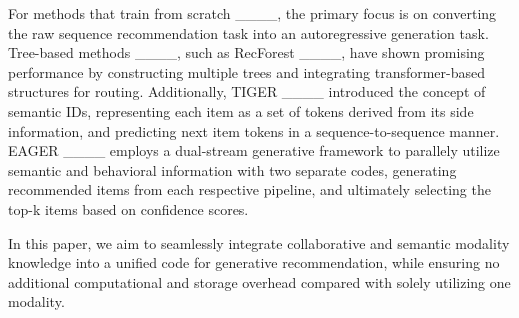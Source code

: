 For methods that train from scratch ____, the primary focus is on converting the raw sequence recommendation task into an autoregressive generation task. Tree-based methods ____, such as RecForest  ____, have shown promising performance by constructing multiple trees and integrating transformer-based structures for routing. Additionally, TIGER ____ introduced the concept of semantic IDs, representing each item as a set of tokens derived from its side information, and predicting next item tokens in a sequence-to-sequence manner. EAGER ____ employs a dual-stream generative framework to parallely utilize semantic and behavioral information with two separate codes, generating recommended items from each respective pipeline, and ultimately selecting the top-k items based on confidence scores. 

In this paper, we aim to seamlessly integrate collaborative and semantic modality knowledge into a unified code for generative recommendation, while ensuring no additional computational and storage overhead compared with solely utilizing one modality.